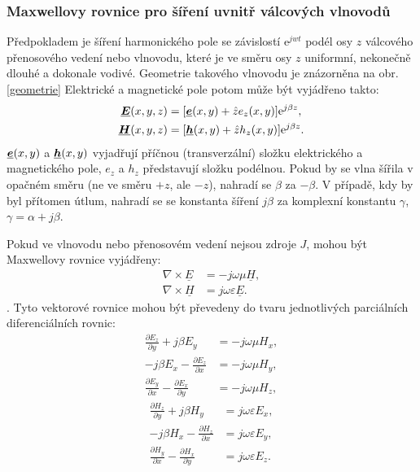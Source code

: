 \documentclass[12pt,a4paper,oneside]{article}
\numberwithin{equation}{section} %
\numberwithin{figure}{section} %
\numberwithin{table}{section} %
\newcommand{\me}{\mathrm{e}} %
\renewcommand{\vec}[1]{\mbox{\boldmath$#1$}} %
\newcommand{\faz}[1]{{\underline{#1}}} %
\begin{document}
\subsubsection{Maxwellovy rovnice pro šíření uvnitř válcových vlnovodů}
Předpokladem je šíření harmonického pole se závislostí $\me ^{jwt}$ podél osy $z$ válcového přenosového vedení nebo vlnovodu, které je ve směru osy $z$ uniformní, nekonečně dlouhé a dokonale vodivé. Geometrie takového vlnovodu je znázorněna na obr. \ref{geometrie} Elektrické a magnetické pole potom může být vyjádřeno takto:
\begin{subequations}
\label{hromadna}
\begin{align}
\faz{\vec{E}}(x, y, z)&=[\faz{\vec{e}}(x, y) + \hat{z}e_z(x, y)] \me ^{j\beta z} ,
\\
\faz{\vec{H}}(x, y, z)&=[\faz{\vec{h}}(x, y) + \hat{z}h_z(x, y)] \me ^{j\beta z} .
\end{align}
\end{subequations}
$\faz{\vec{e}}(x,y)$ a $\faz{\vec{h}}(x,y)$ vyjadřují příčnou (transverzální) složku elektrického a magnetického pole, $e_z$ a $h_z$ představují složku podélnou. Pokud by se vlna šířila v opačném směru (ne ve směru $+z$, ale $-z$), nahradí se $\beta$ za $-\beta$. V případě, kdy by byl přítomen útlum, nahradí se se konstanta šíření $j \beta$ za komplexní konstantu $\gamma$, $\gamma = \alpha + j \beta$.

Pokud ve vlnovodu nebo přenosovém vedení nejsou zdroje $J$, mohou být Maxwellovy rovnice vyjádřeny:
\begin{subequations}
\label{maxvektor2}
\begin{align}
\nabla \times \faz{E} &= -j\omega \mu \faz{H} ,
\\
\nabla \times \faz{H} &= j\omega \varepsilon \faz{E} .
\end{align}
\end{subequations}
.
Tyto vektorové rovnice mohou být převedeny do tvaru jednotlivých parciálních diferenciálních rovnic:
\begin{subequations}
\begin{align}
\frac{\partial E_z}{\partial y} + j \beta E_y &= -j \omega \mu H_x ,
\label{maxpart1}
\\
-j \beta E_x - \frac{\partial E_z}{\partial x} &= - j \omega \mu H_y ,
\\
\frac{\partial E_y}{\partial x} - \frac{\partial E_x}{\partial y} &= -j \omega \mu H_z ,
\end{align}
\end{subequations}
\begin{subequations}
\begin{align}
\frac{\partial H_z}{\partial y} + j \beta H_y &= j \omega \varepsilon E_x ,
\label{maxpart4}
\\
-j \beta H_x - \frac{\partial H_z}{\partial x} &= j \omega \varepsilon E_y ,
\label{maxpart5}
\\
\frac{\partial H_y}{\partial x} - \frac{\partial H_x}{\partial y} &= j \omega \varepsilon E_z .
\end{align}
\end{subequations}
\end{document}
